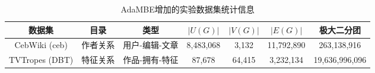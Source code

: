 \begin{table} [t]
	\centering    
	\setlength{\abovecaptionskip}{0cm}  
  \setlength{\belowcaptionskip}{-0.5cm}
	\caption{AdaMBE增加的实验数据集统计信息}      
	\label{tbl:ada_datasets}
	\setlength{\tabcolsep}{1pt}
	\begin{center}
				\normalsize{
		\begin{tabular}{|c|c|c|c|c|c|c|}
			\hline 
			\textbf{数据集} &\textbf{目录} &\textbf{类型} & \textbf{$|U(G)|$} & \textbf{$|V(G)|$} & \textbf{$|E(G)|$} &\textbf{极大二分团}\\
			\hline
      CebWiki (ceb) & 作者关系 & 用户-编辑-文章 & 8,483,068 & 3,132 & 11,792,890 & 263,138,916\\
			TVTropes (DBT) & 特征关系 & 作品-拥有-特征 & 87,678 & 64,415 & 3,232,134 & 19,636,996,096 \\ 

\end{tabular}}
\end{center}
\end{table}
